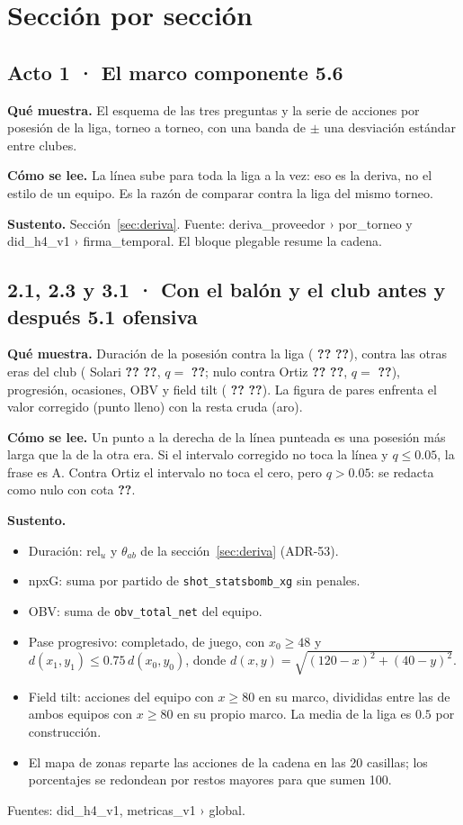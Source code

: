 \documentclass[11pt,a4paper]{article}
\newcommand{\cifraPosJ}{\textbf{??}}\newcommand{\cifraPosJic}{\textbf{??}}%
\newcommand{\cifraSolJ}{\textbf{??}}\newcommand{\cifraSolJic}{\textbf{??}}%
\newcommand{\cifraSolJq}{\textbf{??}}\newcommand{\cifraOrtJ}{\textbf{??}}%
\newcommand{\cifraOrtJic}{\textbf{??}}\newcommand{\cifraOrtJq}{\textbf{??}}%
\newcommand{\cifraOrtJmargen}{\textbf{??}}\newcommand{\cifraFtJ}{\textbf{??}}%
\newcommand{\cifraFtJic}{\textbf{??}}\newcommand{\cifraPresJO}{\textbf{??}}%
\newcommand{\nivel}[1]{\fbox{\footnotesize\textbf{#1}}}
\newcommand{\fuente}[1]{{\small\ttfamily #1}}
\newcommand{\bloque}[3]{\par\textbf{Qué muestra.} #1\par\textbf{Cómo se lee.} #2\par\textbf{Sustento.} #3\par}
\begin{document}
\section{Sección por sección}

\subsection*{Acto 1 · El marco \hfill{\normalfont\small componente 5.6}}
\bloque{El esquema de las tres preguntas y la serie de acciones por posesión de
la liga, torneo a torneo, con una banda de $\pm$ una desviación estándar entre
clubes.}
{La línea sube para toda la liga a la vez: eso es la deriva, no el estilo de un
equipo. Es la razón de comparar contra la liga del mismo torneo.}
{Sección~\ref{sec:deriva}. Fuente: \fuente{deriva\_proveedor › por\_torneo} y
\fuente{did\_h4\_v1 › firma\_temporal}. El bloque plegable resume la cadena.}

\subsection*{2.1, 2.3 y 3.1 · Con el balón y el club antes y después \hfill{\normalfont\small 5.1 ofensiva}}
\bloque{Duración de la posesión contra la liga (\nivel{B} \cifraPosJ{}
\cifraPosJic), contra las otras eras del club (\nivel{A} Solari \cifraSolJ{}
\cifraSolJic, $q=$ \cifraSolJq; nulo contra Ortiz \cifraOrtJ{} \cifraOrtJic,
$q=$ \cifraOrtJq), progresión, ocasiones, OBV y field tilt
(\nivel{B} \cifraFtJ{} \cifraFtJic). La figura de pares enfrenta el valor
corregido (punto lleno) con la resta cruda (aro).}
{Un punto a la derecha de la línea punteada es una posesión más larga que la
de la otra era. Si el intervalo corregido no toca la línea y $q\le 0.05$, la
frase es A. Contra Ortiz el intervalo no toca el cero, pero $q>0.05$: se
redacta como nulo con cota \cifraOrtJmargen.}
{\begin{itemize}
\item Duración: $\text{rel}_u$ y $\theta_{ab}$ de la sección~\ref{sec:deriva} (ADR-53).
\item npxG: suma por partido de \texttt{shot\_statsbomb\_xg} sin penales.
\item OBV: suma de \texttt{obv\_total\_net} del equipo.
\item Pase progresivo: completado, de juego, con $x_0 \ge 48$ y
  $d(x_1,y_1) \le 0.75\, d(x_0,y_0)$, donde $d(x,y)=\sqrt{(120-x)^2+(40-y)^2}$.
\item Field tilt: acciones del equipo con $x\ge 80$ en su marco, divididas entre
  las de ambos equipos con $x\ge 80$ en su propio marco. La media de la liga es
  $0.5$ por construcción.
\item El mapa de zonas reparte las acciones de la cadena en las 20 casillas; los
  porcentajes se redondean por restos mayores para que sumen 100.
\end{itemize}
Fuentes: \fuente{did\_h4\_v1}, \fuente{metricas\_v1 › global}.}
\end{document}
